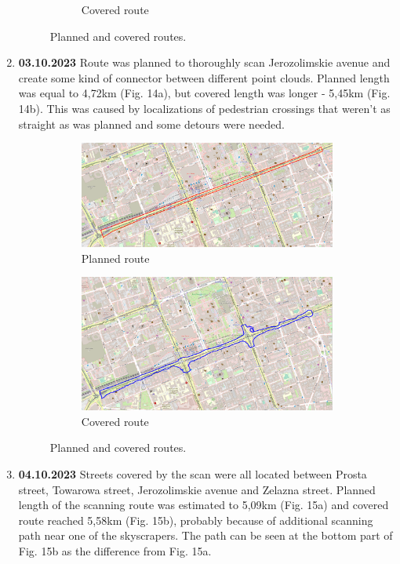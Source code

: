 \documentclass[a4paper,12pt]{article}
\begin{document}
\begin{enumerate}
\begin{figure}[H]
\begin{subfigure}{.77\textwidth}
			\caption{Covered route}
			\label{fig:b12}
		\end{subfigure}
		\caption{Planned and covered routes.}
		\label{fig:fig12}
	\end{figure} 
	\item \textbf{03.10.2023} Route was planned to thoroughly scan Jerozolimskie avenue and create some kind of connector between different point clouds. Planned length was equal to 4,72km (Fig. 14a), but covered length was longer - 5,45km (Fig. 14b). This was caused by localizations of pedestrian crossings that weren't as straight as was planned and some detours were needed.
	\begin{figure}[H]
		\centering
		\begin{subfigure}{.77\textwidth}
			\centering
			\includegraphics[width=1\linewidth]{route_p13}
			\caption{Planned route}
			\label{fig:a13}
		\end{subfigure}%
		\linebreak
		\begin{subfigure}{.77\textwidth}
			\centering
			\includegraphics[width=1\linewidth]{route_c13}
			\caption{Covered route}
			\label{fig:b13}
		\end{subfigure}
		\caption{Planned and covered routes.}
		\label{fig:fig13}
	\end{figure} 
	\item \textbf{04.10.2023} Streets covered by the scan were all located between Prosta street, Towarowa street, Jerozolimskie avenue and Zelazna street. Planned length of the scanning route was estimated to 5,09km (Fig. 15a) and covered route reached 5,58km (Fig. 15b), probably because of additional scanning path near one of the skyscrapers. The path can be seen at the bottom part of Fig. 15b as the difference from Fig. 15a.

\end{enumerate}
\end{document}
